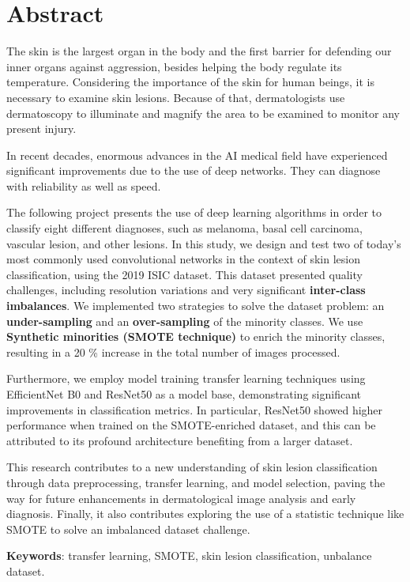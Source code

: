 \chapter*{Abstract}

\onehalfspacing

The skin is the largest organ in the body and the first barrier for defending our inner organs against aggression, besides helping the body regulate its temperature. Considering the importance of the skin for human beings, it is necessary to examine skin lesions. Because of that, dermatologists use dermatoscopy to illuminate and magnify the area to be examined to monitor any present injury.  

In recent decades, enormous advances in the AI medical field have experienced significant improvements due to the use of deep networks. They can diagnose with reliability as well as speed. 

The following project presents the use of deep learning algorithms in order to classify eight different diagnoses, such as melanoma, basal cell carcinoma, vascular lesion, and other lesions. In this study, we design and test two of today's most commonly used convolutional networks in the context of skin lesion classification, using the 2019 ISIC dataset. This dataset presented quality challenges, including resolution variations and very significant \textbf{inter-class imbalances}. We implemented two strategies to solve the dataset problem: an \textbf{under-sampling} and an \textbf{over-sampling} of the minority classes. We use \textbf{Synthetic minorities (SMOTE technique)} to enrich the minority classes, resulting in a 20 \% increase in the total number of images processed.

Furthermore, we employ model training transfer learning techniques using EfficientNet B0 and ResNet50 as a model base, demonstrating significant improvements in classification metrics. In particular, ResNet50 showed higher performance when trained on the SMOTE-enriched dataset, and this can be attributed to its 
 profound architecture benefiting from a larger dataset.

This research contributes to a new understanding of skin lesion classification through data preprocessing, transfer learning, and model selection, paving the way for future enhancements in dermatological image analysis and early diagnosis. Finally, it also contributes exploring the use of a statistic technique like SMOTE to solve an imbalanced dataset challenge.



\vspace{1.5cm}

\textbf{Keywords}: transfer learning, SMOTE, skin lesion classification, unbalance dataset.
